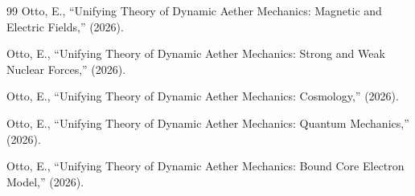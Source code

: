 \documentclass[12pt,letterpaper]{article}
\begin{document}
\begin{thebibliography}{99}
Otto, E.,
``Unifying Theory of Dynamic Aether Mechanics: Magnetic and Electric Fields,''
(2026).

Otto, E.,
``Unifying Theory of Dynamic Aether Mechanics: Strong and Weak Nuclear Forces,''
(2026).

Otto, E.,
``Unifying Theory of Dynamic Aether Mechanics: Cosmology,''
(2026).

Otto, E.,
``Unifying Theory of Dynamic Aether Mechanics: Quantum Mechanics,''
(2026).

Otto, E.,
``Unifying Theory of Dynamic Aether Mechanics: Bound Core Electron Model,''
(2026).

\end{thebibliography}
\end{document}
